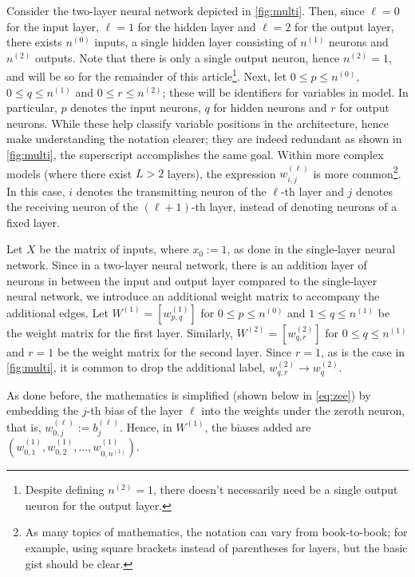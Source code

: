 Consider the two-layer neural network depicted in \autoref{fig:multi}. Then, since $\ell=0$ for the input layer, $\ell=1$ for the hidden layer and $\ell=2$ for the output layer, there exists $n^{(0)}$ inputs, a single hidden layer consisting of $n^{(1)}$ neurons and $n^{(2)}$ outputs. Note that there is only a single output neuron, hence $n^{(2)}=1$, and will be so for the remainder of this article\footnote{Despite defining $n^{(2)}=1$, there doesn't necessarily need be a single output neuron for the output layer.}. Next, let $0\leq p \leq n^{(0)}$, $0\leq q \leq n^{(1)}$ and $0\leq r \leq n^{(2)}$; these will be identifiers for variables in model. In particular, $p$ denotes the input neurons, $q$ for hidden neurons and $r$ for output neurons. While these help classify variable positions in the architecture, hence make understanding the notation clearer; they are indeed redundant as shown in \autoref{fig:multi}, the superscript accomplishes the same goal. Within more complex models (where there exist $L>2$ layers), the expression $w^{(\ell)}_{i,j}$ is more common\footnote{As many topics of mathematics, the notation can vary from book-to-book; for example, using square brackets instead of parentheses for layers, but the basic gist should be clear. }.  In this case, $i$ denotes the transmitting neuron of the $\ell$-th layer and $j$ denotes the receiving neuron of the $(\ell+1)$-th layer, instead of denoting neurons of a fixed layer.

Let $X$ be the matrix of inputs, where $x_0:=1$, as done in the single-layer neural network. Since in a two-layer neural network, there is an addition layer of neurons in between the input and output layer compared to the single-layer neural network, we introduce an additional weight matrix to accompany the additional edges. 
Let $W^{(1)}=[w^{(1)}_{p,q}]$ for $0\leq p \leq n^{(0)}$ and $1\leq q \leq n^{(1)}$ be the weight matrix for the first layer. Similarly, $W^{(2)}=[w^{(2)}_{q,r}]$ for $0\leq q \leq n^{(1)}$ and $r=1$ be the weight matrix for the second layer. Since $r=1$, as is the case in  \autoref{fig:multi}, it is common to drop the additional label, $w^{(2)}_{q,r}\rightarrow w^{(2)}_{q}$. 

As done before, the mathematics is simplified (shown below in \autoref{eq:zee}) by embedding the $j$-th bias of the layer $\ell$ into the weights under the zeroth neuron, that is, $w^{(\ell)}_{0,j}:=b^{(\ell)}_{j}$. Hence, in $W^{(1)}$, the biases added are $(w^{(1)}_{0,1},w^{(1)}_{0,2},\dots,w^{(1)}_{0,n^{(1)}})$.

